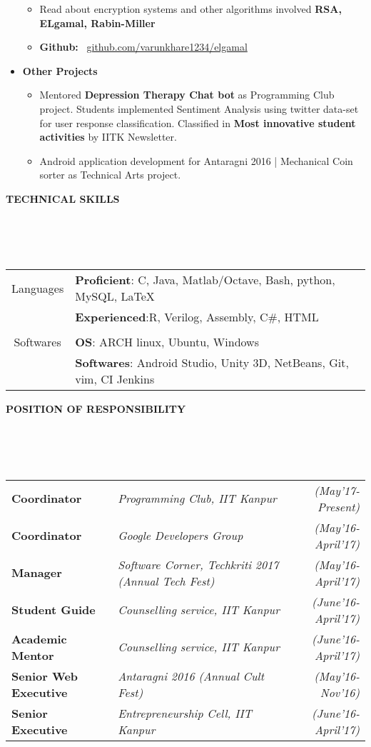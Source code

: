 \documentclass[a4paper,10pt]{article}
\newcommand{\lsep}{-0.5cm}
\newcommand{\resheading}[1]{{\small \colorbox{mygrey}{\begin{minipage}{0.975\textwidth}{\textbf{#1 \vphantom{p\^{E}}}}\end{minipage}}}}
\begin{document}
\begin{itemize}
\begin{itemize}
	\item Read about encryption systems and other algorithms involved \textbf{RSA, ELgamal, Rabin-Miller}
	\item \textbf{Github:} \ \href{https://github.com/varunkhare1234/elgamal}{github.com/varunkhare1234/elgamal}
	\end{itemize}
\item\textbf{Other Projects}
    \begin{itemize}
    \item Mentored \textbf{Depression Therapy Chat bot} as Programming Club project. Students implemented Sentiment Analysis using twitter data-set for user response classification. Classified in \textbf{Most innovative student activities} by IITK Newsletter.
    \item Android application development for Antaragni 2016 | Mechanical Coin sorter as Technical Arts project.
    \end{itemize}
\end{itemize}	

\resheading{\textbf{TECHNICAL SKILLS} }\\[\lsep]
\\ \\
\indent \begin{tabular}{c @{\hskip 0.3in}| @{\hskip 0.1in}l}
    Languages & \textbf{Proficient}: C, Java, Matlab/Octave, Bash, python, MySQL, \LaTeX \\
     & \textbf{Experienced}:R, Verilog, Assembly, C\#, HTML\\
     \\
     Softwares & \textbf{OS}: ARCH linux, Ubuntu, Windows\\
     & \textbf{Softwares}: Android Studio, Unity 3D, NetBeans, Git, vim, CI Jenkins
\end{tabular}

\resheading{\textbf{POSITION OF RESPONSIBILITY} }\\[\lsep]
\\ \\ \indent
\begin{tabular}{l @{\hskip 0.5in}l @{\hskip 0.3in}r }
\textbf{Coordinator} & \textit{Programming Club, IIT Kanpur} & \emph{(May'17-Present)}\\
\textbf{Coordinator} & \textit{Google Developers Group} &
\emph{(May'16-April'17)}\\
\textbf{Manager} & \textit{Software Corner, Techkriti 2017 (Annual Tech Fest)} &
\emph{(May'16-April'17)}\\
\textbf{Student Guide} & \textit{Counselling service, IIT Kanpur} & \emph{(June'16-April'17)}\\
\textbf{Academic Mentor} & \textit{Counselling service, IIT Kanpur} & \emph{(June'16-April'17)}\\
\textbf{Senior Web Executive} & \textit{Antaragni 2016 (Annual Cult Fest)} & \emph{(May'16-Nov'16)}\\
\textbf{Senior Executive} & \textit{Entrepreneurship Cell, IIT Kanpur} & \emph{(June'16-April'17)}\\
\end{tabular}
\end{document}
